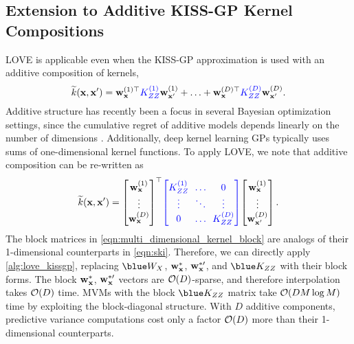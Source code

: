\subsection{Extension to Additive KISS-GP Kernel Compositions}
LOVE{} is applicable even when the KISS-GP approximation is used with an additive composition of kernels,
%
\begin{equation}
  \widetilde{k}(\mathbf{x}, \mathbf{x}') =
  \mathbf{w}^{(1)\top}_{\mathbf{x}} {\color{blue} K^{(1)}_{Z Z}} \mathbf{w}^{(1)}_{\mathbf{x}'} + \ldots + \mathbf{w}^{(D)\top}_{\mathbf{x}} {\color{blue} K^{(D)}_{Z Z}} \mathbf{w}^{(D)}_{\mathbf{x}'}.
  \notag
\end{equation}
Additive structure has recently been a focus in several Bayesian optimization settings, since the cumulative regret of additive models depends linearly on the number of dimensions
\cite{kandasamy2015high,wang2017batched,gardner2017discovering,wang2017max}.
Additionally, deep kernel learning GPs \citep{wilson2016deep,wilson2016stochastic} typically uses sums of one-dimensional kernel functions.
To apply LOVE{}, we note that additive composition can be re-written as
%
\begin{equation}
  \widetilde{k}(\bx, \bx') =
  \begin{bmatrix}
    \bw^{(1)}_{\bx} \\
    \vdots \\
    \bw^{(D)}_{\bx}
  \end{bmatrix}^\top
  \!
  {\color{blue}
  \begin{bmatrix}
    \bK^{(1)}_{\bZ \bZ} & \!\! \ldots \!\! & 0 \\
    \vdots & \!\! \ddots \!\! & \vdots \\
    0 & \!\! \ldots \!\! & \bK^{(D)}_{\bZ \bZ}
  \end{bmatrix}
  }
  \!
  \begin{bmatrix}
    \bw^{(1)}_{\bx} \\
    \vdots \\
    \bw^{(D)}_{\bx'}
  \end{bmatrix}.
  \label{eqn:multi_dimensional_kernel_block}
\end{equation}
%
The block matrices in \cref{eqn:multi_dimensional_kernel_block} are analogs of their 1-dimensional counterparts in \cref{eqn:ski}.
Therefore, we can directly apply \cref{alg:love_kissgp}, replacing $\blue \bW_\bX$, $\bw_\bxtest$, $\bw_\bxtestprime$, and $\blue \bK_{\bZ\bZ}$ with their block forms.
The block $\bw_\bxtest$, $\bw_\bxtestprime$ vectors are $\bigo{D}$-sparse, and therefore interpolation takes $\bigo{D}$ time.
MVMs with the block $\blue \bK_{\bZ\bZ}$ matrix take $\bigo{DM\log M}$ time by exploiting the block-diagonal structure.
With $D$ additive components, predictive variance computations cost only a factor $\bigo{D}$ more than their 1-dimensional counterparts.
